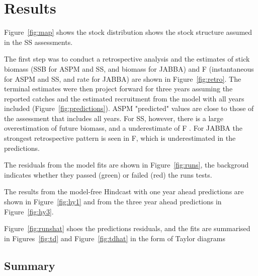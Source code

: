 \documentclass[a4paper]{article}
\begin{document}
%

\section{Results}

Figure~\ref{fig:map} shows the stock distribution shows the stock structure assumed in the SS assessments.

The first step was to conduct a retrospective analysis and the estimates of stick biomass (SSB for ASPM and SS, and biomass for JABBA) and F (instantaneous for ASPM and SS, and rate for JABBA) are shown in Figure~\ref{fig:retro}. The terminal estimates were then project forward for three years assuming the reported catches and the estimated recruitment from the model with all years included  (Figure~\ref{fig:predictions}). ASPM "predicted" values are close to those of the assessment that includes all years. For SS, however, there is a large overestimation of future biomass, and a underestimate of F . For JABBA the strongest retrospective pattern is seen in F, which is underestimated in the predictions.

The residuals from the model fits are shown in Figure~\ref{fig:runs}, the backgroud indicates whether they passed (green) or failed (red) the runs tests. 

The results from the model-free  Hindcast with one year ahead predictions are shown in Figure~\ref{fig:hy1} and from the three year ahead predictions in Figure~\ref{fig:hy3}.

Figure~\ref{fig:runshat} shoes the predictions residuals, and the fits are summarised in Figures~\ref{fig:td} and Figure~\ref{fig:tdhat} in the form of Taylor diagrams

\subsection*{Summary}
\end{document}

